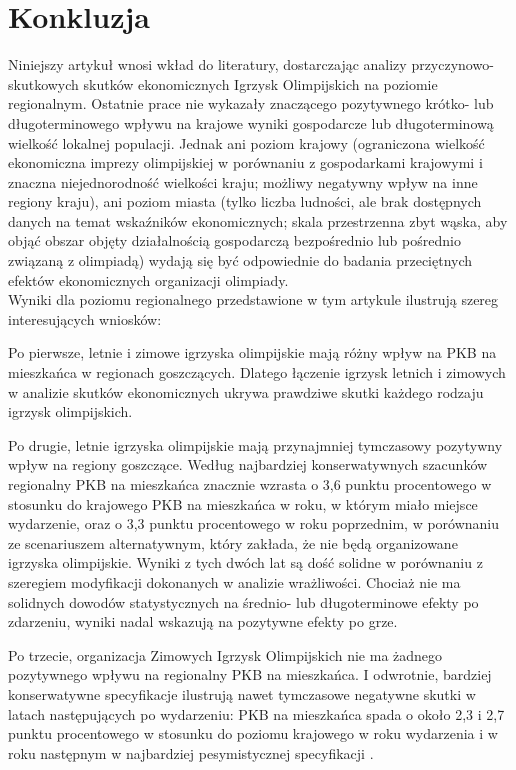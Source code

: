 \documentclass[12pt]{article}
\begin{document}
\section{Konkluzja}
Niniejszy artykuł wnosi wkład do literatury, dostarczając analizy przyczynowo-skutkowych skutków ekonomicznych Igrzysk Olimpijskich na poziomie regionalnym. Ostatnie prace nie wykazały znaczącego pozytywnego krótko- lub długoterminowego wpływu na krajowe wyniki gospodarcze lub długoterminową wielkość lokalnej populacji. Jednak ani poziom krajowy (ograniczona wielkość ekonomiczna imprezy olimpijskiej w porównaniu z gospodarkami krajowymi i znaczna niejednorodność wielkości kraju; możliwy negatywny wpływ na inne regiony kraju), ani poziom miasta (tylko liczba ludności, ale brak dostępnych danych na temat wskaźników ekonomicznych; skala przestrzenna zbyt wąska, aby objąć obszar objęty działalnością gospodarczą bezpośrednio lub pośrednio związaną z olimpiadą) wydają się być odpowiednie do badania przeciętnych efektów ekonomicznych organizacji olimpiady. \\

Wyniki dla poziomu regionalnego przedstawione w tym artykule ilustrują szereg interesujących wniosków: 

Po pierwsze, letnie i zimowe igrzyska olimpijskie mają różny wpływ na PKB na mieszkańca w regionach goszczących. Dlatego łączenie igrzysk letnich i zimowych w analizie skutków ekonomicznych ukrywa prawdziwe skutki każdego rodzaju igrzysk olimpijskich. 

Po drugie, letnie igrzyska olimpijskie mają przynajmniej tymczasowy pozytywny wpływ na regiony goszczące. Według najbardziej konserwatywnych szacunków regionalny PKB na mieszkańca znacznie wzrasta o 3,6 punktu procentowego w stosunku do krajowego PKB na mieszkańca w roku, w którym miało miejsce wydarzenie, oraz o 3,3 punktu procentowego w roku poprzednim, w porównaniu ze scenariuszem alternatywnym, który zakłada, że nie będą organizowane igrzyska olimpijskie. Wyniki z tych dwóch lat są dość solidne w porównaniu z szeregiem modyfikacji dokonanych w analizie wrażliwości. Chociaż nie ma solidnych dowodów statystycznych na średnio- lub długoterminowe efekty po zdarzeniu, wyniki nadal wskazują na pozytywne efekty po grze. 

Po trzecie, organizacja Zimowych Igrzysk Olimpijskich nie ma żadnego pozytywnego wpływu na regionalny PKB na mieszkańca. I odwrotnie, bardziej konserwatywne specyfikacje ilustrują nawet tymczasowe negatywne skutki w latach następujących po wydarzeniu: PKB na mieszkańca spada o około 2,3 i 2,7 punktu procentowego w stosunku do poziomu krajowego w roku wydarzenia i w roku następnym w najbardziej pesymistycznej specyfikacji .\\
\end{document}
